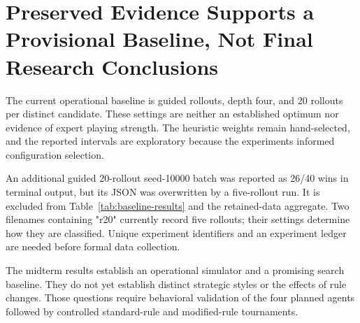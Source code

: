\section{Preserved Evidence Supports a Provisional Baseline, Not Final Research Conclusions}

The current operational baseline is guided rollouts, depth four, and 20 rollouts per distinct candidate. These settings are neither an established optimum nor evidence of expert playing strength. The heuristic weights remain hand-selected, and the reported intervals are exploratory because the experiments informed configuration selection.

An additional guided 20-rollout seed-10000 batch was reported as 26/40 wins in terminal output, but its JSON was overwritten by a five-rollout run. It is excluded from Table~\ref{tab:baseline-results} and the retained-data aggregate. Two filenames containing "r20" currently record five rollouts; their settings determine how they are classified. Unique experiment identifiers and an experiment ledger are needed before formal data collection.

The midterm results establish an operational simulator and a promising search baseline. They do not yet establish distinct strategic styles or the effects of rule changes. Those questions require behavioral validation of the four planned agents followed by controlled standard-rule and modified-rule tournaments.
